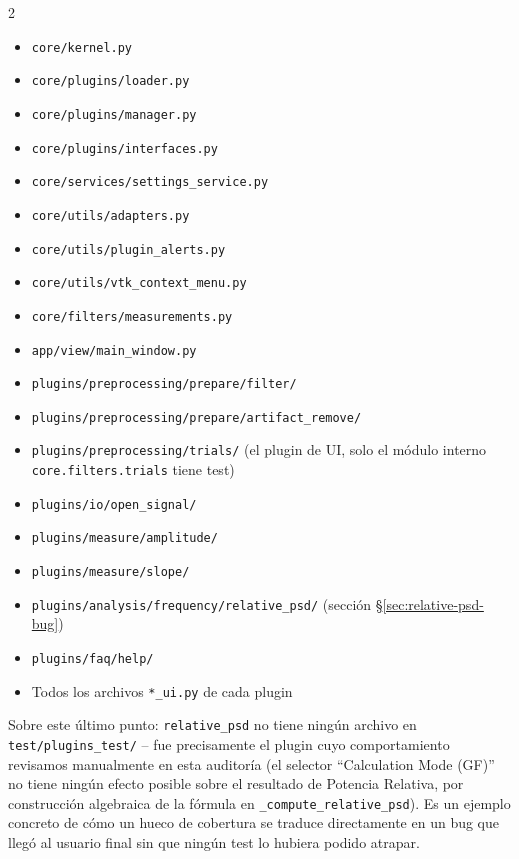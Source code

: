 \documentclass[11pt,a4paper]{article}
\begin{document}
\begin{multicols}{2}
\begin{itemize}[nosep]
  \item \texttt{core/kernel.py}
  \item \texttt{core/plugins/loader.py}
  \item \texttt{core/plugins/manager.py}
  \item \texttt{core/plugins/interfaces.py}
  \item \texttt{core/services/settings\_\allowbreak service.py}
  \item \texttt{core/utils/adapters.py}
  \item \texttt{core/utils/plugin\_\allowbreak alerts.py}
  \item \texttt{core/utils/vtk\_\allowbreak context\_\allowbreak menu.py}
  \item \texttt{core/filters/measurements.py}
  \item \texttt{app/view/main\_\allowbreak window.py}
  \item \texttt{plugins/preprocessing/prepare/filter/}
  \item \texttt{plugins/preprocessing/prepare/artifact\_\allowbreak remove/}
  \item \texttt{plugins/preprocessing/trials/} (el plugin de UI, solo el módulo interno \texttt{core.filters.trials} tiene test)
  \item \texttt{plugins/io/open\_\allowbreak signal/}
  \item \texttt{plugins/measure/amplitude/}
  \item \texttt{plugins/measure/slope/}
  \item \texttt{plugins/analysis/frequency/relative\_\allowbreak psd/} (sección \S\ref{sec:relative-psd-bug})
  \item \texttt{plugins/faq/help/}
  \item Todos los archivos \texttt{*\_\allowbreak ui.py} de cada plugin
\end{itemize}
\end{multicols}

Sobre este último punto: \texttt{relative\_\allowbreak psd} no tiene ningún archivo en \texttt{test/plugins\_\allowbreak test/} --
fue precisamente el plugin cuyo comportamiento revisamos manualmente en esta auditoría (el selector
``Calculation Mode (GF)'' no tiene ningún efecto posible sobre el resultado de Potencia Relativa, por
construcción algebraica de la fórmula en \texttt{\_\allowbreak compute\_\allowbreak relative\_\allowbreak psd}). Es un ejemplo concreto de cómo
un hueco de cobertura se traduce directamente en un bug que llegó al usuario final sin que ningún test lo
hubiera podido atrapar.
\label{sec:relative-psd-bug}
\end{document}
